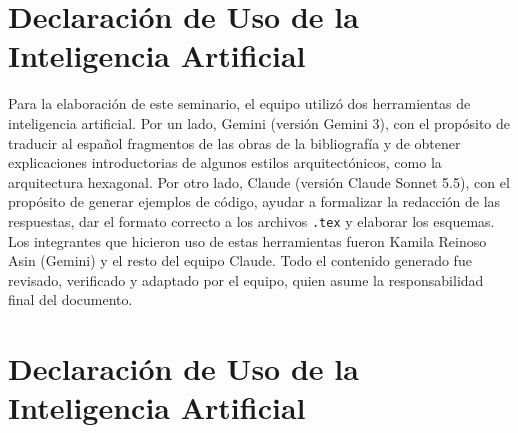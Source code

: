 \documentclass[12pt,a4paper]{article}
\begin{document}
\section*{Declaración de Uso de la Inteligencia Artificial}

Para la elaboración de este seminario, el equipo utilizó dos herramientas de inteligencia artificial. Por un lado, Gemini (versión Gemini 3), con el propósito de traducir al español fragmentos de las obras de la bibliografía y de obtener explicaciones introductorias de algunos estilos arquitectónicos, como la arquitectura hexagonal. Por otro lado, Claude (versión Claude Sonnet 5.5), con el propósito de generar ejemplos de código, ayudar a formalizar la redacción de las respuestas, dar el formato correcto a los archivos \texttt{.tex} y elaborar los esquemas. Los integrantes que hicieron uso de estas herramientas fueron Kamila Reinoso Asin (Gemini)  y el resto del equipo Claude. Todo el contenido generado fue revisado, verificado y adaptado por el equipo, quien asume la responsabilidad final del documento.\section*{Declaración de Uso de la Inteligencia Artificial}
\end{document}
